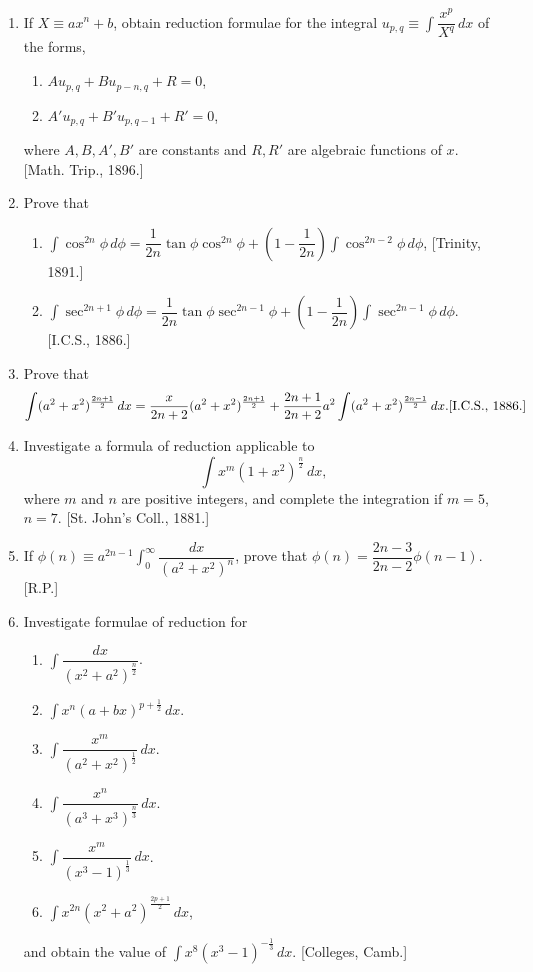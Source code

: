 \documentclass[11pt, a4paper]{article}
\newcommand{\source}[1]{\hfill\textnormal{[#1]}}
\begin{document}
\begin{enumerate}[leftmargin=2em]

\item If $X\equiv ax^n+b$, obtain reduction formulae for the integral $u_{p,q}\equiv\displaystyle\int \dfrac{x^p}{X^q}\,dx$ of the forms,
\begin{enumerate}[label=(\roman*)]
\item $Au_{p,q}+Bu_{p-n,q}+R=0$,
\item $A'u_{p,q}+B'u_{p,q-1}+R'=0$,
\end{enumerate}
where $A,B,A',B'$ are constants and $R,R'$ are algebraic functions of $x$. \source{Math. Trip., 1896.}

\item Prove that
\begin{enumerate}[label=(\alph*)]
\item $\displaystyle\int \cos^{2n}\phi\,d\phi=\dfrac{1}{2n}\tan\phi\cos^{2n}\phi+\left(1-\dfrac{1}{2n}\right)\int \cos^{2n-2}\phi\,d\phi$, \source{Trinity, 1891.}
\item $\displaystyle\int \sec^{2n+1}\phi\,d\phi=\dfrac{1}{2n}\tan\phi\sec^{2n-1}\phi+\left(1-\dfrac{1}{2n}\right)\int \sec^{2n-1}\phi\,d\phi$. \source{I.C.S., 1886.}
\end{enumerate}

\item Prove that
\[
\int (a^2+x^2)^{\frac{2n+1}{2}}\,dx=\dfrac{x}{2n+2}(a^2+x^2)^{\frac{2n+1}{2}}+\dfrac{2n+1}{2n+2}a^2\int (a^2+x^2)^{\frac{2n-1}{2}}\,dx. \source{I.C.S., 1886.}
\]

\item Investigate a formula of reduction applicable to
\[
\int x^m(1+x^2)^{\frac{n}{2}}\,dx,
\]
where $m$ and $n$ are positive integers, and complete the integration if $m=5$, $n=7$. \source{St. John's Coll., 1881.}

\item If $\phi(n)\equiv a^{2n-1}\displaystyle\int_0^\infty \dfrac{dx}{(a^2+x^2)^n}$, prove that $\phi(n)=\dfrac{2n-3}{2n-2}\phi(n-1)$. \source{R.P.}

\item Investigate formulae of reduction for
\begin{enumerate}[label=(\alph*)]
\item $\displaystyle\int \dfrac{dx}{(x^2+a^2)^{\frac{n}{2}}}$.
\item $\displaystyle\int x^n(a+bx)^{p+\frac12}\,dx$.
\item $\displaystyle\int \dfrac{x^m}{(a^2+x^2)^{\frac12}}\,dx$.
\item $\displaystyle\int \dfrac{x^n}{(a^3+x^3)^{\frac{n}{3}}}\,dx$.
\item $\displaystyle\int \dfrac{x^m}{(x^3-1)^{\frac13}}\,dx$.
\item $\displaystyle\int x^{2n}(x^2+a^2)^{\frac{2p+1}{2}}\,dx$,
\end{enumerate}
and obtain the value of $\displaystyle\int x^8(x^3-1)^{-\frac13}\,dx$. \source{Colleges, Camb.}


\end{enumerate}
\end{document}

